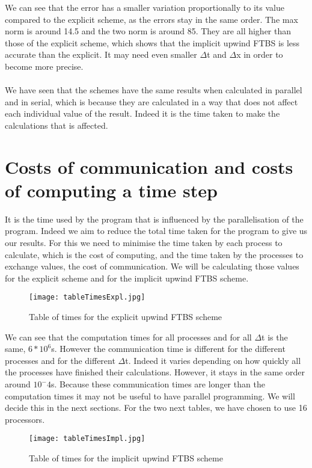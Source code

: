 \documentclass [10 pt, a4 paper]{report}
\begin{document}
\noindent
We can see that the error has a smaller variation proportionally to its value compared to the explicit scheme, as the errors stay in the same order. The max norm is around 14.5 and the two norm is around 85. They are all higher than those of the explicit scheme, which shows that the implicit upwind FTBS is less accurate than the explicit. It may need even smaller $\Delta$t and $\Delta$x in order to become more precise.
\\ \\
We have seen that the schemes have the same results when calculated in parallel and in serial, which is because they are calculated in a way that does not affect each individual value of the result. Indeed it is the time taken to make the calculations that is affected.


\section{Costs of communication and costs of computing a time step}
It is the time used by the program that is influenced by the parallelisation of the program. Indeed we aim to reduce the total time taken for the program to give us our results. For this we need to minimise the time taken by each process to calculate, which is the cost of computing, and the time taken by the processes to exchange values, the cost of communication. We will be calculating those values for the explicit scheme and for the implicit upwind FTBS scheme.


\begin{figure}[!htbp]
\centering
\texttt{[image: tableTimesExpl.jpg]}
\caption{\label{fig:image} Table of times for the explicit upwind FTBS scheme}
\end{figure}

\noindent
We can see that the computation times for all processes and for all $\Delta$t is the same, $6*10^6$s. However the communication time is different for the different processes and for the different $\Delta$t. Indeed it varies depending on how quickly all the processes have finished their calculations. However, it stays in the same order around $10^-4$s. Because these communication times are longer than the computation times it may not be useful to have parallel programming. We will decide this in the next sections. For the two next tables, we have chosen to use 16 processors.

\begin{figure}[!htbp]
\centering
\texttt{[image: tableTimesImpl.jpg]}
\caption{\label{fig:image} Table of times for the implicit upwind FTBS scheme}
\end{figure}
\end{document}
